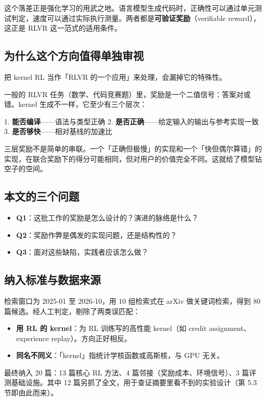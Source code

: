 这个落差正是强化学习的用武之地。语言模型生成代码时，正确性可以通过单元测试判定，速度可以通过实际执行测量。两者都是\textbf{可验证奖励}（verifiable reward），这正是 RLVR 这一范式的适用条件。

\subsection{为什么这个方向值得单独审视}

把 kernel RL 当作「RLVR 的一个应用」来处理，会漏掉它的特殊性。

一般的 RLVR 任务（数学、代码竞赛题）里，奖励是一个二值信号：答案对或错。kernel 生成不一样，它至少有三个层次：

1. \textbf{能否编译}——语法与类型正确
2. \textbf{是否正确}——给定输入的输出与参考实现一致
3. \textbf{是否够快}——相对基线的加速比

三层奖励不是简单的串联。一个「正确但极慢」的实现和一个「快但偶尔算错」的实现，在联合奖励下的得分可能相同，但对用户的价值完全不同。这就给了模型钻空子的空间。

\subsection{本文的三个问题}

\begin{itemize}
\item \textbf{Q1}：这批工作的奖励是怎么设计的？演进的脉络是什么？
\item \textbf{Q2}：奖励作弊是偶发的实现问题，还是结构性的？
\item \textbf{Q3}：面对这些缺陷，实践者应该怎么做？
\end{itemize}

\subsection{纳入标准与数据来源}

检索窗口为 2025-01 至 2026-10，用 10 组检索式在 arXiv 做关键词检索，得到 80 篇候选。经人工判定，剔除了两类误匹配：

\begin{itemize}
\item \textbf{用 RL 的 kernel}：为 RL 训练写的高性能 kernel（如 credit assignment、experience replay）。方向正好相反。
\item \textbf{同名不同义}：「kernel」指统计学核函数或高斯核，与 GPU 无关。
\end{itemize}

最终纳入 20 篇：13 篇核心 RL 方法、4 篇邻接（奖励成本、环境信号）、3 篇评测基础设施。其中 12 篇另抓了全文，用于查证摘要里看不到的实验设计（第 5.3 节即由此而来）。


